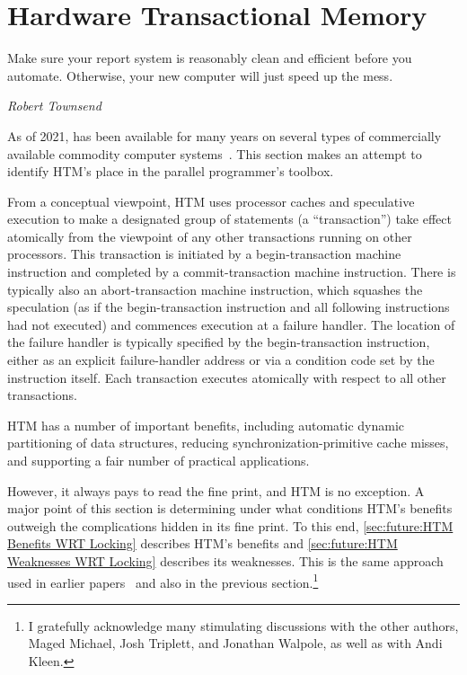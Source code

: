 
\section{Hardware Transactional Memory}
\label{sec:future:Hardware Transactional Memory}
%
\epigraph{Make sure your report system is reasonably clean and efficient
	  before you automate.
	  Otherwise, your new computer will just speed up the mess.}
	 {\emph{Robert Townsend}}

As of 2021,  has been available for many
years on several types of commercially available commodity computer
systems~\cite{Yoo:2013:PEI:2503210.2503232,RickMerrit2011PowerTM,ChristianJacobi2012MainframeTM,TimothyHayes2020ARM-HTM}.
This section makes an attempt to identify HTM's place in the parallel
programmer's toolbox.

From a conceptual viewpoint, HTM uses processor caches and speculative
execution to make a designated group of statements (a ``transaction'')
take effect atomically
from the viewpoint of any other transactions running on other processors.
This transaction is initiated by a
begin-transaction machine instruction and completed by a commit-transaction
machine instruction.
There is typically also an abort-transaction machine instruction, which
squashes the speculation (as if the begin-transaction instruction and
all following instructions had not executed) and commences execution
at a failure handler.
The location of the failure handler is typically specified by the
begin-transaction instruction, either as an explicit failure-handler
address or via a condition code set by the instruction itself.
Each transaction executes atomically with respect to all other transactions.

HTM has a number of important benefits, including automatic
dynamic partitioning of data structures, reducing synchronization-primitive
cache misses, and supporting a fair number of practical applications.

However, it always pays to read the fine print, and HTM is no exception.
A major point of this section is determining under what conditions HTM's
benefits outweigh the complications hidden in its fine print.
To this end, \cref{sec:future:HTM Benefits WRT Locking}
describes HTM's benefits and
\cref{sec:future:HTM Weaknesses WRT Locking} describes its weaknesses.
This is the same approach used in earlier
papers~\cite{McKenney2007PLOSTM,PaulEMcKenney2010OSRGrassGreener}
and also in the previous section.\footnote{
	I gratefully acknowledge many stimulating
	discussions with the other authors, Maged Michael, Josh Triplett,
	and Jonathan Walpole, as well as with Andi Kleen.}

